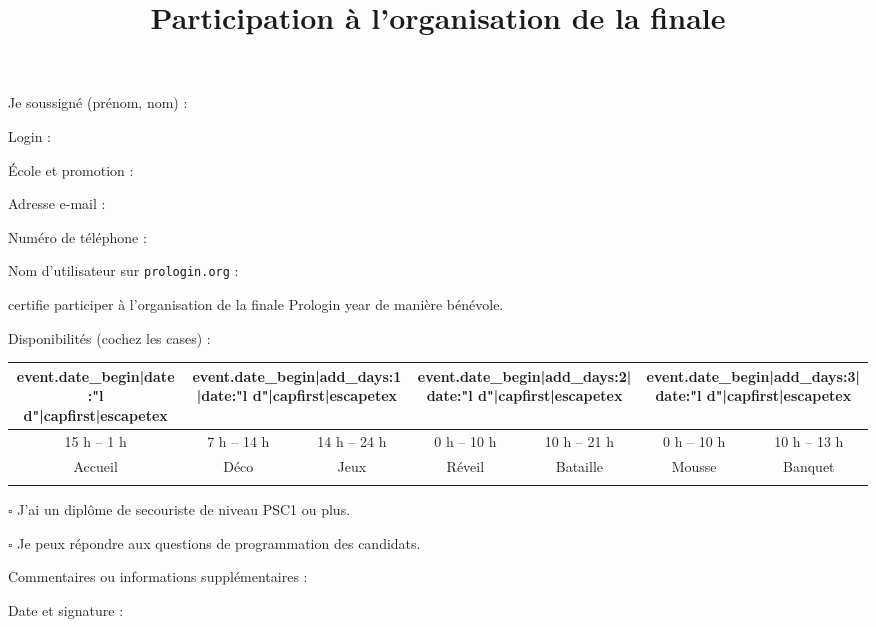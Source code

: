 \documentclass[a4paper,11pt]{prologin}
\title{Participation à l'organisation de la finale}
\begin{document}
{
Je soussigné (prénom, nom) : \hrulefill

Login : \hrulefill

École et promotion : \hrulefill

Adresse e-mail : \hrulefill

Numéro de téléphone : \hrulefill

Nom d'utilisateur sur \texttt{prologin.org} : \hrulefill

}

certifie participer à l'organisation de la finale Prologin {{ year }} de
manière bénévole.

Disponibilités (cochez les cases) :

\begin{center}
\begin{tabular}{|c|c|c|c|c|c|c|}

\hline
{{ event.date_begin|date:"l d"|capfirst|escapetex }} &
\multicolumn{2}{c|}{ {{ event.date_begin|add_days:1|date:"l d"|capfirst|escapetex }} } &
\multicolumn{2}{c|}{ {{ event.date_begin|add_days:2|date:"l d"|capfirst|escapetex }} } &
\multicolumn{2}{c|}{ {{ event.date_begin|add_days:3|date:"l d"|capfirst|escapetex }} }
\tabularnewline
\hline
15 h -- 1 h & 7 h -- 14 h & 14 h -- 24 h & 0 h -- 10 h & 10 h -- 21 h &
0 h -- 10 h & 10 h -- 13 h\tabularnewline
\hline
Accueil & Déco & Jeux & Réveil & Bataille & Mousse & Banquet\tabularnewline
\hline
&&&&&&\tabularnewline
\hline
\end{tabular}
\end{center}

{\Large$\square$} J'ai un diplôme de secouriste de niveau PSC1 ou plus.

{\Large$\square$} Je peux répondre aux questions de programmation des candidats.

\vspace{0.5cm}

Commentaires ou informations supplémentaires :

\vspace{3.5cm}

Date et signature :
\end{document}

